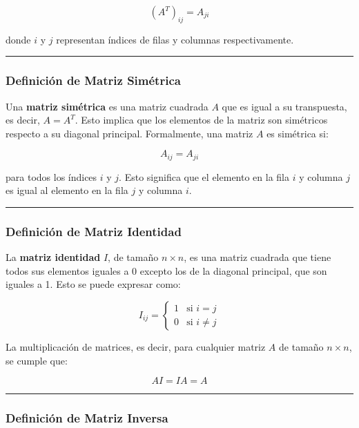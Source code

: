 \documentclass[
  letterpaper,
  DIV=11,
  numbers=noendperiod]{scrartcl}
\begin{document}
\[
(A^T)_{ij} = A_{ji}
\]

donde \(i\) y \(j\) representan índices de filas y columnas
respectivamente.

\begin{center}\rule{0.5\linewidth}{0.5pt}\end{center}

\subsubsection{Definición de Matriz
Simétrica}\label{definiciuxf3n-de-matriz-simuxe9trica}

Una \textbf{matriz simétrica} es una matriz cuadrada \(A\) que es igual
a su transpuesta, es decir, \(A = A^T\). Esto implica que los elementos
de la matriz son simétricos respecto a su diagonal principal.
Formalmente, una matriz \(A\) es simétrica si:

\[
A_{ij} = A_{ji}
\]

para todos los índices \(i\) y \(j\). Esto significa que el elemento en
la fila \(i\) y columna \(j\) es igual al elemento en la fila \(j\) y
columna \(i\).

\begin{center}\rule{0.5\linewidth}{0.5pt}\end{center}

\subsubsection{Definición de Matriz
Identidad}\label{definiciuxf3n-de-matriz-identidad}

La \textbf{matriz identidad} \(I\), de tamaño \(n \times n\), es una
matriz cuadrada que tiene todos sus elementos iguales a 0 excepto los de
la diagonal principal, que son iguales a 1. Esto se puede expresar como:

\[
I_{ij} = 
\begin{cases} 
1 & \text{si } i = j \\
0 & \text{si } i \neq j
\end{cases}
\]

La multiplicación de matrices, es decir, para cualquier matriz \(A\) de
tamaño \(n \times n\), se cumple que:

\[
AI = IA = A
\]

\begin{center}\rule{0.5\linewidth}{0.5pt}\end{center}

\subsubsection{Definición de Matriz
Inversa}\label{definiciuxf3n-de-matriz-inversa}
\end{document}
